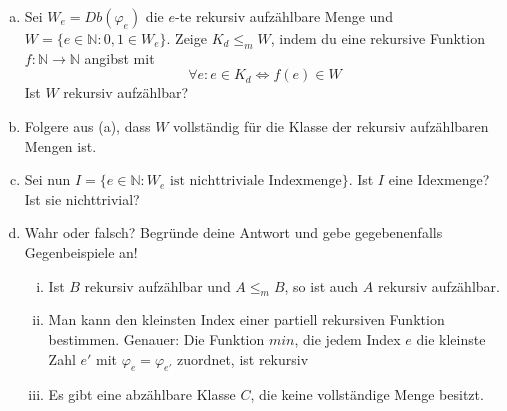 \documentclass[german,headsepline]{scrartcl}
\theoremstyle{definition}
\begin{document}
	\begin{question}[subtitle={Blatt 13, 2015}]
		\begin{enumerate}[(a)]
			\item Sei $W_e=Db(\varphi_e)$ die $e$-te rekursiv aufzählbare Menge
				und $W=\{e\in\mathbb{N}\colon0,1\in W_e\}$.
				Zeige $K_d\leq_mW$, indem du eine rekursive Funktion $f:\mathbb{N}\to\mathbb{N}$ angibst mit
				\[\forall e\colon e\in K_d\Leftrightarrow f(e)\in W\]
				Ist $W$ rekursiv aufzählbar?
			\item Folgere aus (a), dass $W$ vollständig für die Klasse der rekursiv aufzählbaren Mengen ist.
			\item Sei nun $I=\{e\in\mathbb{N}\colon W_e\text{ ist nichttriviale Indexmenge}\}$.
				Ist $I$ eine Idexmenge? Ist sie nichttrivial?
			\item Wahr oder falsch?
				Begründe deine Antwort und gebe gegebenenfalls Gegenbeispiele an!
				\begin{enumerate}[(i)]
					\item Ist $B$ rekursiv aufzählbar und $A\leq_m B$, so ist auch $A$ rekursiv aufzählbar.
					\item Man kann den kleinsten Index einer partiell rekursiven Funktion bestimmen.
						Genauer: Die Funktion $min$,
						die jedem Index $e$ die kleinste Zahl $e'$ mit $\varphi_e=\varphi_{e'}$ zuordnet, ist rekursiv
					\item Es gibt eine abzählbare Klasse $C$, die keine vollständige Menge besitzt.
				\end{enumerate}
		\end{enumerate}
	\end{question}
	
\end{document}
